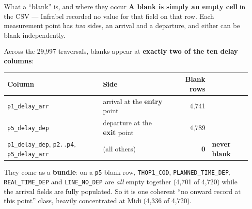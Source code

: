 \documentclass[aspectratio=169,10pt]{beamer}
\begin{document}
\begin{frame}{What a ``blank'' is, and where they occur}
  \textbf{A blank is simply an empty cell} in the CSV --- Infrabel recorded no value for
  that field on that row. Each measurement point has \emph{two} sides, an arrival and a
  departure, and either can be blank independently.

  \vspace{0.7em}
  Across the 29{,}997 traversals, blanks appear at \textbf{exactly two of the ten
  delay columns}:

  \vspace{0.4em}
  \centering
  \begin{tabular}{@{}llrl@{}}
    \toprule
    Column & Side & Blank rows & \\
    \midrule
    \texttt{p1\_delay\_arr} & arrival at the \textbf{entry} point & 4{,}741 & \\
    \texttt{p5\_delay\_dep} & departure at the \textbf{exit} point & 4{,}789 & \\
    \addlinespace
    \texttt{p1\_delay\_dep}, \texttt{p2..p4}, \texttt{p5\_delay\_arr}
      & (all others) & \textbf{0} & \color{caqua}\textbf{never blank} \\
    \bottomrule
  \end{tabular}

  \vspace{0.9em}
  \raggedright
  They come as a \textbf{bundle}: on a \texttt{p5}-blank row, \texttt{THOP1\_COD},
  \texttt{PLANNED\_TIME\_DEP}, \texttt{REAL\_TIME\_DEP} and \texttt{LINE\_NO\_DEP} are
  \emph{all} empty together (4{,}701 of 4{,}720) while the arrival fields are fully
  populated. So it is one coherent ``no onward record at this point'' class, heavily
  concentrated at Midi (4{,}336 of 4{,}720).
\end{frame}
\end{document}
